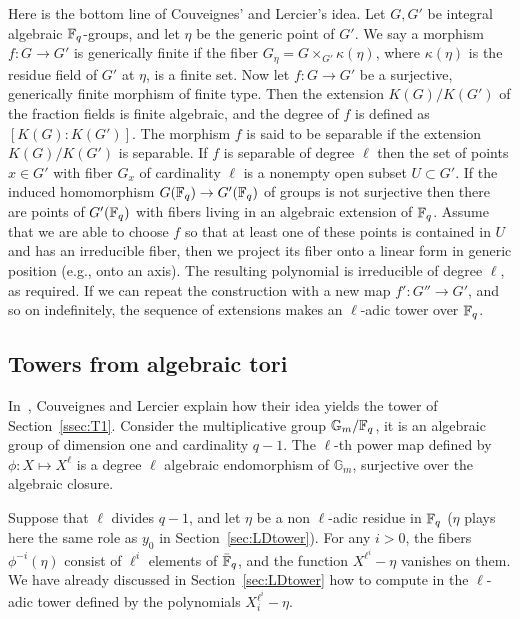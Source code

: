 \documentclass{sig-alternate}
\begin{document}
Here is the bottom line of Couveignes' and Lercier's idea. Let $G, G'$ be integral algebraic 
$\mathbb{F}_q$-groups, and let $\eta$ be the generic point of $G'$. We say a morphism $f: G \rightarrow 
G'$ is generically finite if the fiber $G_\eta = G \times_{G'} \kappa(\eta)$, where $\kappa(\eta)$ 
is the residue field of $G'$ at $\eta$, is a finite set. Now let $f: G \rightarrow G'$ be a 
surjective, generically finite morphism of finite type. Then the extension $K(G)/K(G')$ of the 
fraction fields is finite algebraic, and the degree of $f$ is defined as $[K(G): K(G')]$. The 
morphism $f$ is said to be separable if the extension $K(G)/K(G')$ is separable. If $f$ is 
separable of degree $\ell$ then the set of points $x \in G'$ with fiber $G_x$ of cardinality 
$\ell$ is a nonempty open subset $U \subset G'$. If the induced homomorphism $G(\mathbb{F}_q) \rightarrow 
G'(\mathbb{F}_q)$ of groups is not surjective then there are points of $G'(\mathbb{F}_q)$ with fibers living in an 
algebraic extension of $\mathbb{F}_q$. Assume that we are able to choose $f$ so that at least one of these 
points is contained in $U$ and has an irreducible fiber, then we project its fiber onto a linear 
form in generic position (e.g., onto an axis). The resulting polynomial is irreducible of degree 
$\ell$, as required. If we can repeat the construction with a new map $f':G''\to G'$, and so on 
indefinitely, the sequence of extensions makes an $\ell$-adic tower over $\mathbb{F}_q$.






\subsection{Towers from algebraic tori}
\label{ssec:fibers-T2}
In~\cite{couveignes+lercier11}, Couveignes and Lercier explain how
their idea yields the tower of Section~\ref{ssec:T1}. Consider the
multiplicative group $\mathbb{G}_m/\mathbb{F}_q$, it is an algebraic group of
dimension one and cardinality $q-1$.  The $\ell$-th power map defined
by $\phi:X\mapsto X^\ell$ is a degree $\ell$ algebraic endomorphism of
$\mathbb{G}_m$, surjective over the algebraic closure.

Suppose that $\ell$ divides $q-1$, and let $\eta$ be a non $\ell$-adic
residue in $\mathbb{F}_q$ ($\eta$ plays here the same role as $y_0$ in
Section~\ref{sec:LDtower}). For any $i>0$, the fibers
$\phi^{-i}(\eta)$ consist of $\ell^i$ elements of $\bar{\mathbb{F}}_q$, and
the function $X^{\ell^i}-\eta$ vanishes on them. We have already
discussed in Section~\ref{sec:LDtower} how to compute in the
$\ell$-adic tower defined by the polynomials $X_i^{\ell^i}-\eta$.
\end{document}
